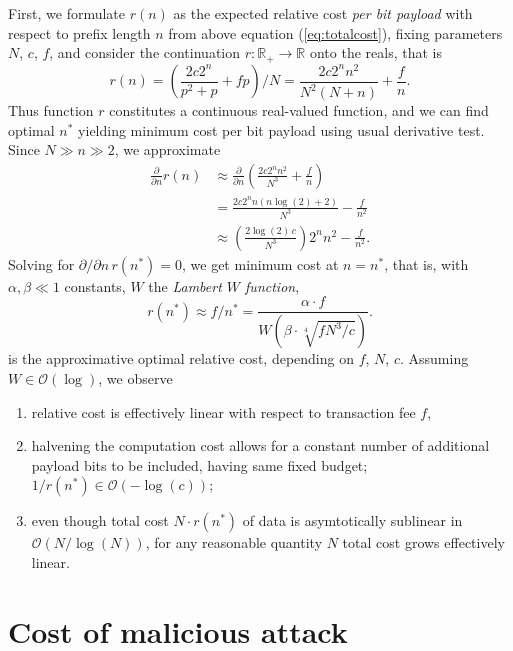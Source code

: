 \documentclass[10pt,a4paper,twocolumn]{article}
\begin{document}
First, we formulate $r(n)$ as the expected relative cost \emph{per bit payload} with respect to prefix length $n$ from above equation (\ref{eq:totalcost}), fixing parameters $N$, $c$, $f$, and consider the continuation $r\colon \mathbb{R}_+ \to \mathbb{R}$ onto the reals, that is
\[ 
    r(n) = \left(\frac{2c2^{n}}{p^2+p} + fp\right)/N = \frac{2c 2^{n} n^2}{N^2 (N+n)}+\frac{f}{n}. 
\]
Thus function $r$ constitutes a continuous real-valued function, and we can find optimal $n^*$ yielding minimum cost per bit payload using usual derivative test.
Since $N\gg n\gg 2$, we approximate
\begin{align*}
    \frac{\partial}{\partial n} r(n)   &\approx \frac{\partial}{\partial n} \left( \frac{2c 2^{n} n^2}{N^3}+\frac{f}{n} \right)\\
                                         &= \frac{2c 2^{n} n (n \log (2)+2)}{N^3}-\frac{f}{n^2}\\
                                         &\approx \left(\frac{2 \log (2)\,c}{N^3}\right) 2^{n} n^2 -\frac{f}{n^{2}}.
\end{align*}
Solving for $\partial/\partial n\, r(n^*)=0$, we get minimum cost at $n=n^*$, that is, with $\alpha, \beta \ll 1$ constants, $W$ the \emph{Lambert $W$ function},
\[ r(n^*) \approx f/n^* = \frac{\alpha\cdot f}{W\left(\beta\cdot\sqrt[4]{f N^3/c}\right)}. \]
is the approximative optimal relative cost, depending on $f$, $N$, $c$.
Assuming $W\in \mathcal{O}(\log)$, we observe
\begin{enumerate}
    \item relative cost is effectively linear with respect to transaction fee $f$,
    \item halvening the computation cost allows for a constant number of additional payload bits to be included, having same fixed budget; $1/r(n^*) \in \mathcal{O}(-\log(c))$;
    \item even though total cost $N\cdot r(n^*)$ of data is asymtotically sublinear in $\mathcal{O}(N / \log(N))$, for any reasonable quantity $N$ total cost grows effectively linear.
\end{enumerate}

\section{Cost of malicious attack}
\end{document}
